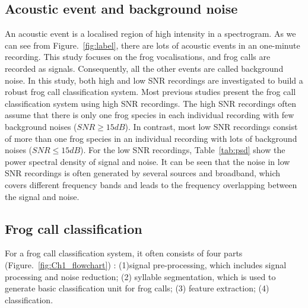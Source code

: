 \subsection{Acoustic event and background noise}
An acoustic event is a localised region of high intensity in a spectrogram. As we can see from Figure.~\ref{fig:label}, there are lots of acoustic events in an one-minute recording. This study focuses on the frog vocalisations, and frog calls are recorded as signals. Consequently, all the other events are called background noise. 
In this study, both high and low SNR recordings are investigated to build a robust frog call classification system. Most previous studies present the frog call classification system using high SNR recordings. The high SNR recordings often assume that there is only one frog species in each individual recording with few background noises ($SNR \geq 15 dB$). In contrast, most low SNR recordings consist of more than one frog species in an individual recording with lots of background noises ($SNR \leq 15 dB$). For the low SNR recordings, Table~\ref{tab:psd} show the power spectral density of signal and noise. It can be seen that the noise in low SNR recordings is often generated by several sources and broadband, which covers different frequency bands and leads to the frequency overlapping between the signal and noise. 






\subsection{Frog call classification}

For a frog call classification system, it often consists of four parts (Figure.~\ref{fig:Ch1_flowchart}) : (1)signal pre-processing, which includes signal processing and noise reduction; (2) syllable segmentation, which is used to generate basic classification unit for frog calls; (3) feature extraction; (4) classification.  



